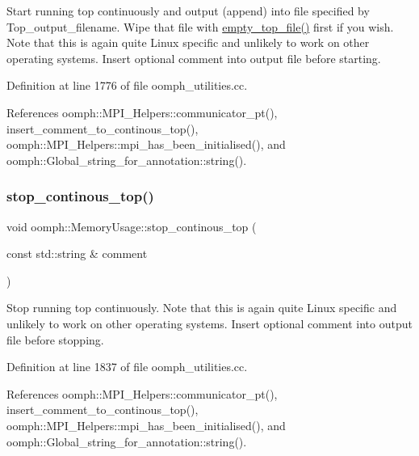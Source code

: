 Start running top continuously and output (append) into file specified by Top\+\_\+output\+\_\+filename. Wipe that file with \hyperlink{namespaceoomph_1_1MemoryUsage_a0034019640ac5f6ffe7e8e40fae1e453}{empty\+\_\+top\+\_\+file()} first if you wish. Note that this is again quite Linux specific and unlikely to work on other operating systems. Insert optional comment into output file before starting. 

Definition at line 1776 of file oomph\+\_\+utilities.\+cc.



References oomph\+::\+M\+P\+I\+\_\+\+Helpers\+::communicator\+\_\+pt(), insert\+\_\+comment\+\_\+to\+\_\+continous\+\_\+top(), oomph\+::\+M\+P\+I\+\_\+\+Helpers\+::mpi\+\_\+has\+\_\+been\+\_\+initialised(), and oomph\+::\+Global\+\_\+string\+\_\+for\+\_\+annotation\+::string().

\mbox{\label{namespaceoomph_1_1MemoryUsage_a64410078236ee55e630ee6416b4ccdb0}} 
\subsubsection{\texorpdfstring{stop\+\_\+continous\+\_\+top()}{stop\_continous\_top()}}
{\footnotesize\ttfamily void oomph\+::\+Memory\+Usage\+::stop\+\_\+continous\+\_\+top (\begin{DoxyParamCaption}\item[{const std\+::string \&}]{comment }\end{DoxyParamCaption})}



Stop running top continuously. Note that this is again quite Linux specific and unlikely to work on other operating systems. Insert optional comment into output file before stopping. 



Definition at line 1837 of file oomph\+\_\+utilities.\+cc.



References oomph\+::\+M\+P\+I\+\_\+\+Helpers\+::communicator\+\_\+pt(), insert\+\_\+comment\+\_\+to\+\_\+continous\+\_\+top(), oomph\+::\+M\+P\+I\+\_\+\+Helpers\+::mpi\+\_\+has\+\_\+been\+\_\+initialised(), and oomph\+::\+Global\+\_\+string\+\_\+for\+\_\+annotation\+::string().



